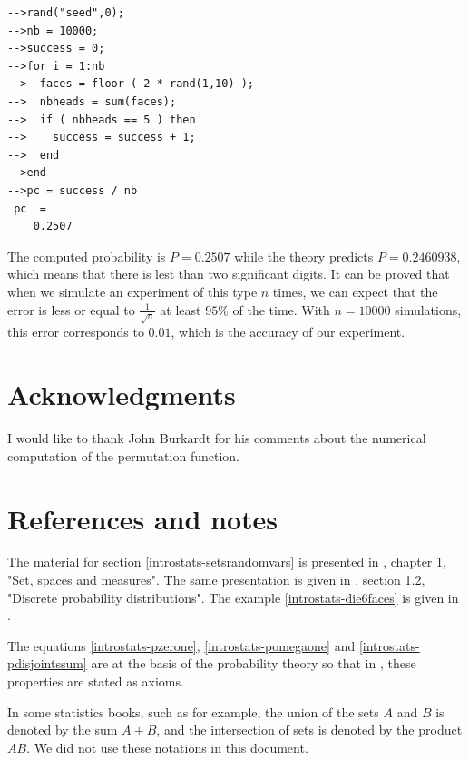 \lstset{language=scilabscript}
\begin{lstlisting}
-->rand("seed",0);
-->nb = 10000;
-->success = 0;
-->for i = 1:nb
-->  faces = floor ( 2 * rand(1,10) );
-->  nbheads = sum(faces);
-->  if ( nbheads == 5 ) then
-->    success = success + 1;
-->  end
-->end
-->pc = success / nb
 pc  =
    0.2507
\end{lstlisting}

The computed probability is $P=0.2507$ while the theory 
predicts $P=0.2460938$, which means that there is lest than 
two significant digits.
It can be proved that when we simulate an experiment of this type $n$ times, 
we can expect that the error is less or equal to $\frac{1}{\sqrt{n}}$ at least $95\%$ of the time.
With $n=10000$ simulations, this error corresponds to $0.01$, which is the 
accuracy of our experiment.

\section{Acknowledgments}

I would like to thank John Burkardt for his comments about the numerical 
computation of the permutation function.




\section{References and notes}

The material for section \ref{introstats-setsrandomvars} is 
presented in \cite{Loeve1963}, chapter 1, "Set, spaces and measures".
The same presentation is given in \cite{introprobasGrinsteadSnell}, section
1.2, "Discrete probability distributions". The example \ref{introstats-die6faces}
is given in \cite{introprobasGrinsteadSnell}.

The equations \ref{introstats-pzerone}, \ref{introstats-pomegaone} and 
\ref{introstats-pdisjointssum} are at the basis of the probability 
theory so that in \cite{Ross1987}, these properties are stated as axioms.

In some statistics books, such as \cite{montecarlomethodsHammersleyHandscomb}
for example, the union of the sets $A$ and $B$ is denoted by the sum $A+B$, and 
the intersection of sets is denoted by the product $AB$.
We did not use these notations in this document.

